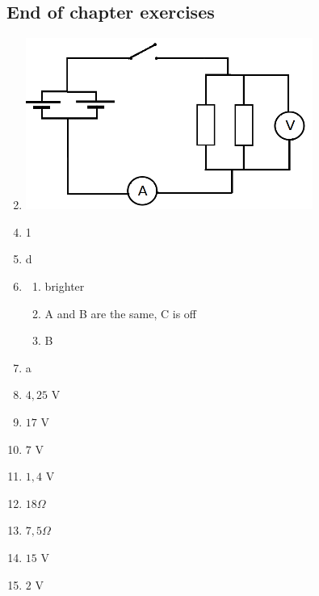 \subsection{End of chapter exercises}
\begin{enumerate}[noitemsep, label=\textbf{(\arabic*)} ]
\setcounter{enumi}{1}
 \item \includegraphics[width=.3\textwidth]{photos/electric_circuits_circuitdiagrm.png}
\end{enumerate}
\begin{multicols}{3}
 \begin{enumerate}[noitemsep, label=\textbf{(\arabic*)} ]
\setcounter{enumi}{3}
\item 1
\item d
\item 
 \begin{enumerate}[noitemsep, label=\textbf{(\alph*)} ]
\item brighter
\item A and B are the same, C is off
\item B
\end{enumerate}
\item a
\item $4,25 \text{ V}$
\item $17 \text{ V}$
\item $7 \text{ V}$
\item $1,4 \text{ V}$
\item $18 \Omega$
\item $7,5 \Omega$
\item $15 \text{ V}$
\item $2 \text{ V}$
 \end{enumerate}
\end{multicols}

